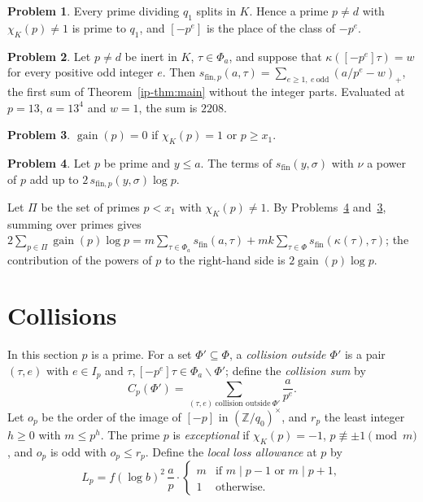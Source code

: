 \documentclass[reqno]{amsart}
\theoremstyle{definition}
\newtheorem{problem}{Problem}[section]
\theoremstyle{plain}
\theoremstyle{definition}
\theoremstyle{remark}
\newcommand{\Z}{{\mathbb{Z}}}
\newcommand{\gain}{\operatorname{gain}}
\newcommand{\sfin}{s_{\mathrm{fin}}}
\newcommand{\sfp}{s_{\mathrm{fin},p}}
\begin{document}
\begin{problem}\label{pr:qone-split}
Every prime dividing \(q_1\) splits in \(K\).  Hence a prime \(p \ne d\) with \(\chi_K(p) \ne 1\) is prime to \(q_1\), and \([-p^e]\) is the place of the class of \(-p^e\).
\end{problem}

\begin{problem}\label{pr:shape}
Let \(p \ne d\) be inert in \(K\), \(\tau \in \Phi_a\), and suppose that \(\kappa([-p^e]\tau) = w\) for every positive odd integer \(e\).  Then \(\sfp(a, \tau) = \sum_{e \ge 1,\ e\ \mathrm{odd}} (a/p^e - w)_+\), the first sum of Theorem~\ref{ip-thm:main} without the integer parts.  Evaluated at \(p = 13\), \(a = 13^4\) and \(w = 1\), the sum is \(2208\).
\end{problem}

\begin{problem}\label{pr:gain-zero}
\(\gain(p) = 0\) if \(\chi_K(p) = 1\) or \(p \ge x_1\).
\end{problem}

\begin{problem}\label{pr:part-at-p}
Let \(p\) be prime and \(y \le a\).  The terms of \(\sfin(y, \sigma)\) with \(\nu\) a power of \(p\) add up to \(2\, \sfp(y, \sigma) \log p\).
\end{problem}

Let \(\Pi\) be the set of primes \(p < x_1\) with \(\chi_K(p) \ne 1\).  By Problems~\ref{pr:part-at-p} and~\ref{pr:gain-zero}, summing over primes gives \(2\sum_{p \in \Pi} \gain(p)\log p = m\sum_{\tau \in \Phi_a} \sfin(a, \tau) + mk \sum_{\tau \in \Phi} \sfin(\kappa(\tau), \tau)\); the contribution of the powers of \(p\) to the right-hand side is \(2\gain(p)\log p\).

\section{Collisions}\label{sec:collisions}

In this section \(p\) is a prime.  For a set \(\Phi' \subseteq \Phi\), a \emph{collision outside \(\Phi'\)} is a pair \((\tau, e)\) with \(e \in I_p\) and \(\tau, [-p^e]\tau \in \Phi_a \smallsetminus \Phi'\); define the \emph{collision sum} by
\[
  C_p(\Phi') = \sum_{(\tau, e)\ \text{collision outside}\ \Phi'} \frac{a}{p^e} .
\]
Let \(o_p\) be the order of the image of \([-p]\) in \((\Z/q_0)^\times\), and \(r_p\) the least integer \(h \ge 0\) with \(m \le p^h\).  The prime \(p\) is \emph{exceptional} if \(\chi_K(p) = -1\), \(p \not\equiv \pm 1 \pmod m\), and \(o_p\) is odd with \(o_p \le r_p\).  Define the \emph{local loss allowance} at \(p\) by
\[
  L_p = f(\log b)^2\, \frac{a}{p} \cdot \begin{cases} m & \text{if } m \mid p - 1 \text{ or } m \mid p + 1,\\ 1 & \text{otherwise.}\end{cases}
\]
\end{document}
